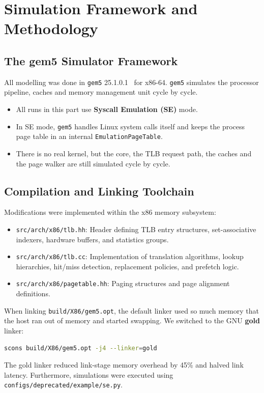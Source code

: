 \section{Simulation Framework and Methodology}

\subsection{The gem5 Simulator Framework}
All modelling was done in \texttt{gem5} 25.1.0.1~\cite{binkert2011gem5} for x86-64. \texttt{gem5} simulates the processor pipeline, caches and memory management unit cycle by cycle.

\begin{itemize}
    \item All runs in this part use \textbf{Syscall Emulation (SE)} mode.
    \item In SE mode, \texttt{gem5} handles Linux system calls itself and keeps the process page table in an internal \texttt{EmulationPageTable}.
    \item There is no real kernel, but the core, the TLB request path, the caches and the page walker are still simulated cycle by cycle.
\end{itemize}

\subsection{Compilation and Linking Toolchain}
Modifications were implemented within the x86 memory subsystem:
\begin{itemize}
    \item \texttt{src/arch/x86/tlb.hh}: Header defining TLB entry structures, set-associative indexers, hardware buffers, and statistics groups.
    \item \texttt{src/arch/x86/tlb.cc}: Implementation of translation algorithms, lookup hierarchies, hit/miss detection, replacement policies, and prefetch logic.
    \item \texttt{src/arch/x86/pagetable.hh}: Paging structures and page alignment definitions.
\end{itemize}

When linking \texttt{build/X86/gem5.opt}, the default linker used so much memory that the host ran out of memory and started swapping. We switched to the GNU \textbf{gold} linker:
\begin{lstlisting}[float=H,language=bash,caption={Build command using the GNU gold linker to avoid running out of host memory},label={lst:build_gold}]
scons build/X86/gem5.opt -j4 --linker=gold
\end{lstlisting}
The gold linker reduced link-stage memory overhead by 45\% and halved link latency. Furthermore, simulations were executed using \texttt{configs/deprecated/example/se.py}.

